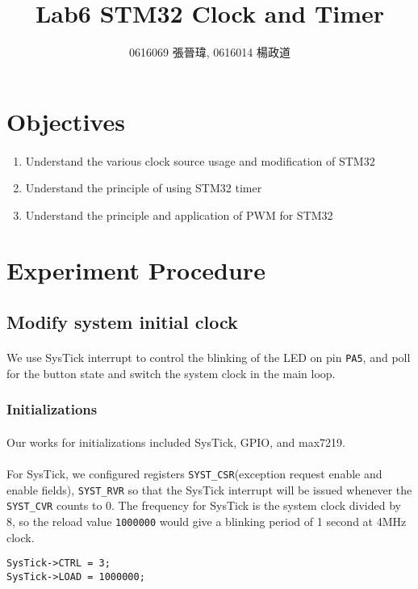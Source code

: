 \title{Lab6 STM32 Clock and Timer}
\author{0616069 張晉瑋, 0616014 楊政道}
\maketitle
\thispagestyle{fancy}
\section{Objectives}
\paragraph{}
\begin{enumerate}
    \item Understand the various clock source usage and modification of STM32
    \item Understand the principle of using STM32 timer
    \item Understand the principle and application of PWM for STM32
\end{enumerate}
\section{Experiment Procedure}
\subsection{Modify system initial clock}
\paragraph{}
We use SysTick interrupt to control the blinking of the LED on pin \texttt{PA5},
and poll for the button state and switch the system clock in the main loop.
\subsubsection{Initializations}
\paragraph{}
Our works for initializations included SysTick, GPIO, and max7219.
\paragraph{}
For SysTick, we configured registers \texttt{SYST\_CSR}(exception request enable and enable fields), \texttt{SYST\_RVR} so that the SysTick interrupt will be issued whenever the \texttt{SYST\_CVR} counts to 0.
The frequency for SysTick is the system clock divided by 8,
so the reload value \texttt{1000000} would give a blinking period of 1 second at 4MHz clock.
\begin{lstlisting}
SysTick->CTRL = 3;
SysTick->LOAD = 1000000;
\end{lstlisting}

